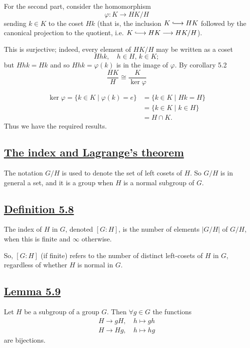 \vspace{1em}

For the second part, consider the homomorphism
\[
\varphi : K \longrightarrow HK/H
\]
sending $k \in K$ to the coset $Hk$ (that is, the inclusion $K \lhook\joinrel\longrightarrow HK$ followed by the canonical projection to the quotient, i.e. $K \lhook\joinrel\longrightarrow HK \longrightarrow HK/H$).


This is surjective; indeed, every element of $HK/H$ may be written as a coset
\[
Hhk, \quad h \in H, \, k \in K;
\]
but $Hhk = Hk$ and so $Hhk = \varphi(k)$ is in the image of $\varphi$. By corollary 5.2
\[
\frac{HK}{H} \cong \frac{K}{\ker \varphi}
\]

\vspace{1em}

\noindent {}
\begin{align*}
\ker \varphi = \{k \in K \mid \varphi(k) = e\} &= \{k \in K \mid Hk = H\} \\
&= \{k \in K \mid k \in H\} \\
&= H \cap K.
\end{align*}
Thus we have the required results.

\vspace{2em}

\subsection*{\underline{The index and Lagrange's theorem}}
The notation $G/H$ is used to denote the set of left cosets of $H$. So $G/H$ is in general a set, and it is a group when $H$ is a normal subgroup of $G$.



\subsection*{\underline{Definition 5.8}}
The index of $H$ in $G$, denoted $[G:H]$, is the number of elements $|G/H|$ of $G/H$, when this is finite and $\infty$ otherwise.

\vspace{1em}

\noindent So, $[G:H]$ (if finite) refers to the number of distinct left-cosets of $H$ in $G$, regardless of whether $H$ is normal in $G$.

\vspace{2em}

\subsection*{\underline{Lemma 5.9}}
Let $H$ be a subgroup of a group $G$. Then $\forall g \in G$ the functions
\begin{align*}
H \longrightarrow gH, \quad h \mapsto gh \\
H \longrightarrow Hg, \quad h \mapsto hg
\end{align*}
are bijections.



